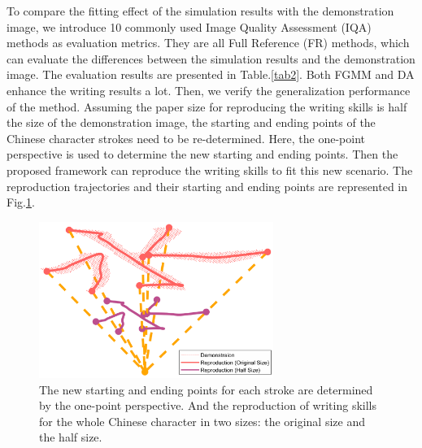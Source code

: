 \documentclass[conference]{IEEEtran}
\begin{document}
To compare the fitting effect of the simulation results with the demonstration image, we introduce 10 commonly used Image Quality Assessment (IQA) methods as evaluation metrics. They are all Full Reference (FR) methods, which can evaluate the differences between the simulation results and the demonstration image. The evaluation results are presented in Table.\ref{tab2}. Both FGMM and DA enhance the writing results a lot. Then, we verify the generalization performance of the method. Assuming the paper size for reproducing the writing skills is half the size of the demonstration image, the starting and ending points of the Chinese character strokes need to be re-determined. Here, the one-point perspective is used to determine the new starting and ending points. Then the proposed framework can reproduce the writing skills to fit this new scenario. The reproduction trajectories and their starting and ending points are represented in Fig.\ref{fig7}.
\begin{figure}[!t]
    \centering
    \includegraphics[width=3in]{./fig/fig7.pdf}
    \caption{The new starting and ending points for each stroke are determined by the one-point perspective. And the reproduction of writing skills for the whole Chinese character in two sizes: the original size and the half size.}
    \label{fig7}
\end{figure}
\end{document}
